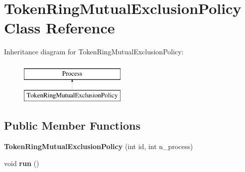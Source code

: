 \hypertarget{classdistributed__system_1_1TokenRingMutualExclusionPolicy}{}\section{Token\+Ring\+Mutual\+Exclusion\+Policy Class Reference}
\label{classdistributed__system_1_1TokenRingMutualExclusionPolicy}
Inheritance diagram for Token\+Ring\+Mutual\+Exclusion\+Policy\+:\begin{figure}[H]
\begin{center}
\leavevmode
\includegraphics[height=2.000000cm]{classdistributed__system_1_1TokenRingMutualExclusionPolicy}
\end{center}
\end{figure}
\subsection*{Public Member Functions}
\begin{DoxyCompactItemize}
\item 
{\bfseries Token\+Ring\+Mutual\+Exclusion\+Policy} (int id, int n\+\_\+process)\hypertarget{classdistributed__system_1_1TokenRingMutualExclusionPolicy_ae1bc7fad7c29f21626a46e7a587330e3}{}\label{classdistributed__system_1_1TokenRingMutualExclusionPolicy_ae1bc7fad7c29f21626a46e7a587330e3}

\item 
void {\bfseries run} ()\hypertarget{classdistributed__system_1_1TokenRingMutualExclusionPolicy_a13a43e6d814de94978c515cb084873b1}{}\label{classdistributed__system_1_1TokenRingMutualExclusionPolicy_a13a43e6d814de94978c515cb084873b1}

\end{DoxyCompactItemize}
